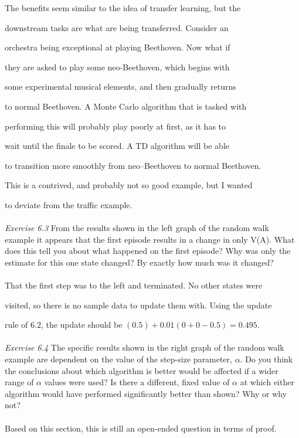 \documentclass{article}
\begin{document}
The benefits seem similar to the idea of transfer learning, but the 

downstream tasks are what are being transferred. Consider an 

orchestra being exceptional at playing Beethoven. Now what if 

they are asked to play some neo-Beethoven, which begins with 

some experimental musical elements, and then gradually returns 

to normal Beethoven. A Monte Carlo algorithm that is tasked with 

performing this will probably play poorly at first, as it has to 

wait until the finale to be scored. A TD algorithm will be able 

to transition more smoothly from neo--Beethoven to normal Beethoven. 

This is a contrived, and probably not so good example, but I wanted 

to deviate from the traffic example. 
\\\\
\textit{Exercise 6.3} From the results shown in the left graph of the random walk example it
appears that the first episode results in a change in only V(A). What does this tell you
about what happened on the first episode? Why was only the estimate for this one state
changed? By exactly how much was it changed?  
\\
\\

That the first step was to the left and terminated. No other states were 

visited, so there is no sample data to update them with. Using the update 

rule of $6.2$, the update should be $(0.5) + 0.01(0 + 0 - 0.5) = 0.495$.
\\\\
\textit{Exercise 6.4} The specific results shown in the right graph of the random walk example
are dependent on the value of the step-size parameter, $\alpha$. Do you think the conclusions
about which algorithm is better would be affected if a wider range of $\alpha$ values were used?
Is there a different, fixed value of $\alpha$ at which either algorithm would have performed
significantly better than shown? Why or why not?   
\\
\\

Based on this section, this is still an open-ended question in terms of proof. 
\end{document}
